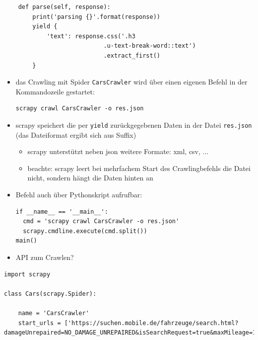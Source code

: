 \documentclass{beamer}
\begin{document}
\begin{frame}
\begin{lstlisting}
    def parse(self, response):
        print('parsing {}'.format(response))
        yield {
            'text': response.css('.h3
                            .u-text-break-word::text')
                            .extract_first()
        }
        	\end{lstlisting}
			
	\framebreak
	
	
	\begin{itemize}
		\item das Crawling mit Spider \lstinline|CarsCrawler| wird über einen eigenen
		Befehl in der Kommandozeile gestartet:
			\begin{lstlisting}
scrapy crawl CarsCrawler -o res.json
			\end{lstlisting}
		\item scrapy speichert die per \lstinline|yield| zurückgegebenen Daten in der Datei 
		\lstinline|res.json| (das Dateiformat ergibt sich aus Suffix) \begin{itemize}
			\item scrapy unterstützt neben json weitere Formate: xml, csv, ... 
			\item beachte: scrapy leert bei mehrfachem Start des Crawlingbefehls die Datei nicht, 
			sondern hängt die Daten hinten an
		\end{itemize}
		\item Befehl auch über Pythonskript aufrufbar: \begin{lstlisting}
if __name__ == '__main__':
  cmd = 'scrapy crawl CarsCrawler -o res.json'
  scrapy.cmdline.execute(cmd.split())
main()		
		\end{lstlisting}
		\item API zum Crawlen?
	\end{itemize}
	
	\framebreak
	
	
			\begin{lstlisting}
import scrapy
			
class Cars(scrapy.Spider):
    
    name = 'CarsCrawler'
    start_urls = ['https://suchen.mobile.de/fahrzeuge/search.html?damageUnrepaired=NO_DAMAGE_UNREPAIRED&isSearchRequest=true&maxMileage=100&maxPowerAsArray=PS&minPowerAsArray=35&minPowerAsArray=PS&minPrice=5000&scopeId=C&usage=NEW&usageType=PRE_REGISTRATION']
    

\end{lstlisting}
\end{frame}
\end{document}
